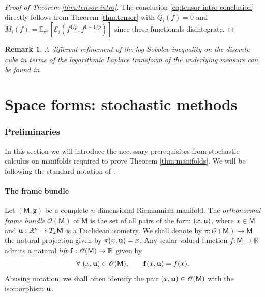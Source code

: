 \documentclass[a4paper,twoside,11pt,reqno]{amsart}
\newtheorem{remark}[theorem]{Remark}
\newcommand{\R}{\mathbb{R}} %
\newcommand{\li}{\bf }
\newcommand{\MM}{\mathsf{M}}
\newcommand{\GG}{\mathsf{g}}
\newcommand{\mb}{\mathbb}
\newcommand{\ms}{\mathscr}
\begin{document}
\begin{proof} [Proof of Theorem \ref{thm:tensor-intro}]
The conclusion \eqref{eq:tensor-intro-conclusion} directly follows from Theorem \ref{thm:tensor} with $Q_i(f)=0$ and $M_i(f) = \mb{E}_{\pi^n} [\ms{E}_i(f^{1/p},f^{1-1/p})]$ since these functionals disintegrate.
\end{proof}

\begin{remark}
A different refinement of the log-Sobolev inequality on the discrete cube in terms of the logarithmic Laplace transform of the underlying measure can be found in \cite[Equation (12)]{Aug21}
\end{remark}




\part{Space forms: stochastic methods}
\label{part:space_forms}


\section{Preliminaries}

In this section we will introduce the necessary prerequisites from stochastic calculus on manifolds required to prove Theorem \ref{thm:manifolds}. We will be following the standard notation of \cite{Hsu02,Pet16}.


\subsection{The frame bundle}

Let $(\MM,\GG)$ be a complete $n$-dimensional Riemannian manifold. The \emph{orthonormal frame bundle} $\ms{O}(\MM)$ of $\MM$ is the set of all pairs of the form $(x, {\bf u})$, where $x\in\MM$ and ${\bf u} : \R^n \to T_x\MM$ is a Euclidean isometry. We shall denote by $\pi:\ms{O}(\MM)\to\MM$ the natural projection given by $\pi(x,{\bf u}) = x$. Any scalar-valued function $f:\MM\to\R$ admits a natural \emph{lift} ${\li f}:\ms{O}(\MM)\to\R$ given by
\begin{equation}
\forall \ (x,{\bf u})\in\ms{O}(\MM),\qquad {\li f}(x,{\bf u}) = f(x).
\end{equation}
Abusing notation, we shall often identify the pair $(x,{\bf u}) \in\ms{O}(\MM)$ with the isomorphism ${\bf u}$. 
\end{document}
